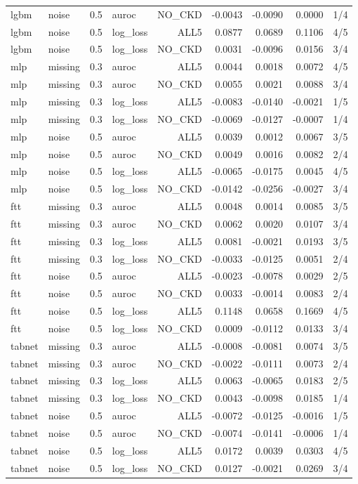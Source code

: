 \begin{tabular}{llllrrrrr}
lgbm & noise & 0.5 & auroc & NO\_CKD & -0.0043 & -0.0090 & 0.0000 & 1/4 \\
lgbm & noise & 0.5 & log\_loss & ALL5 & 0.0877 & 0.0689 & 0.1106 & 4/5 \\
lgbm & noise & 0.5 & log\_loss & NO\_CKD & 0.0031 & -0.0096 & 0.0156 & 3/4 \\
mlp & missing & 0.3 & auroc & ALL5 & 0.0044 & 0.0018 & 0.0072 & 4/5 \\
mlp & missing & 0.3 & auroc & NO\_CKD & 0.0055 & 0.0021 & 0.0088 & 3/4 \\
mlp & missing & 0.3 & log\_loss & ALL5 & -0.0083 & -0.0140 & -0.0021 & 1/5 \\
mlp & missing & 0.3 & log\_loss & NO\_CKD & -0.0069 & -0.0127 & -0.0007 & 1/4 \\
mlp & noise & 0.5 & auroc & ALL5 & 0.0039 & 0.0012 & 0.0067 & 3/5 \\
mlp & noise & 0.5 & auroc & NO\_CKD & 0.0049 & 0.0016 & 0.0082 & 2/4 \\
mlp & noise & 0.5 & log\_loss & ALL5 & -0.0065 & -0.0175 & 0.0045 & 4/5 \\
mlp & noise & 0.5 & log\_loss & NO\_CKD & -0.0142 & -0.0256 & -0.0027 & 3/4 \\
ftt & missing & 0.3 & auroc & ALL5 & 0.0048 & 0.0014 & 0.0085 & 3/5 \\
ftt & missing & 0.3 & auroc & NO\_CKD & 0.0062 & 0.0020 & 0.0107 & 3/4 \\
ftt & missing & 0.3 & log\_loss & ALL5 & 0.0081 & -0.0021 & 0.0193 & 3/5 \\
ftt & missing & 0.3 & log\_loss & NO\_CKD & -0.0033 & -0.0125 & 0.0051 & 2/4 \\
ftt & noise & 0.5 & auroc & ALL5 & -0.0023 & -0.0078 & 0.0029 & 2/5 \\
ftt & noise & 0.5 & auroc & NO\_CKD & 0.0033 & -0.0014 & 0.0083 & 2/4 \\
ftt & noise & 0.5 & log\_loss & ALL5 & 0.1148 & 0.0658 & 0.1669 & 4/5 \\
ftt & noise & 0.5 & log\_loss & NO\_CKD & 0.0009 & -0.0112 & 0.0133 & 3/4 \\
tabnet & missing & 0.3 & auroc & ALL5 & -0.0008 & -0.0081 & 0.0074 & 3/5 \\
tabnet & missing & 0.3 & auroc & NO\_CKD & -0.0022 & -0.0111 & 0.0073 & 2/4 \\
tabnet & missing & 0.3 & log\_loss & ALL5 & 0.0063 & -0.0065 & 0.0183 & 2/5 \\
tabnet & missing & 0.3 & log\_loss & NO\_CKD & 0.0043 & -0.0098 & 0.0185 & 1/4 \\
tabnet & noise & 0.5 & auroc & ALL5 & -0.0072 & -0.0125 & -0.0016 & 1/5 \\
tabnet & noise & 0.5 & auroc & NO\_CKD & -0.0074 & -0.0141 & -0.0006 & 1/4 \\
tabnet & noise & 0.5 & log\_loss & ALL5 & 0.0172 & 0.0039 & 0.0303 & 4/5 \\
tabnet & noise & 0.5 & log\_loss & NO\_CKD & 0.0127 & -0.0021 & 0.0269 & 3/4 \\
\bottomrule
\end{tabular}
